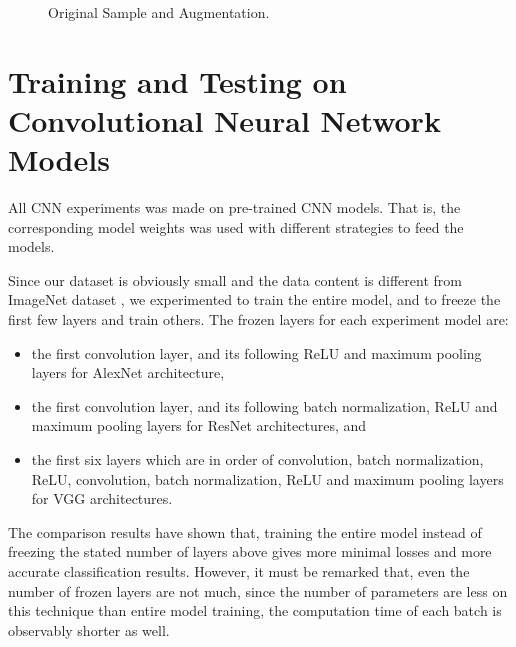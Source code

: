 \begin{figure}[h]
	\caption{Original Sample and Augmentation.}
	\label{augmented_sample}
\end{figure}

\section{Training and Testing on Convolutional Neural Network Models}\label{sec:CH5_cnn_experiments}

All CNN experiments was made on pre-trained CNN models. That is, the corresponding model weights was used with different strategies to feed the models.

Since our dataset is obviously small and the data content is different from ImageNet dataset \cite{imagenet}, we experimented to train the entire model, and to freeze the first few layers and train others. The frozen layers for each experiment model are:

\begin{itemize}
    \item the first convolution layer, and its following ReLU and maximum pooling layers for AlexNet architecture,
    \item the first convolution layer, and its following batch normalization, ReLU and maximum pooling layers for ResNet architectures, and
    \item the first six layers which are in order of convolution, batch normalization, ReLU, convolution, batch normalization, ReLU and maximum pooling layers for VGG architectures.
\end{itemize}

The comparison results have shown that, training the entire model instead of freezing the stated number of layers above gives more minimal losses and more accurate classification results. However, it must be remarked that, even the number of frozen layers are not much, since the number of parameters are less on this technique than entire model training, the computation time of each batch is observably shorter as well. 

